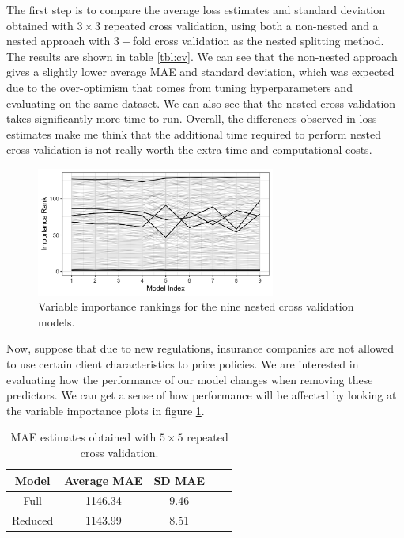 \documentclass[11pt,a4paper]{article}
\theoremstyle{plain}
\theoremstyle{definition}
\begin{document}
The first step is to compare the average loss estimates and standard deviation obtained with $3\times 3$ repeated cross validation, using both a non-nested and a nested approach with $3-$fold cross validation as the nested splitting method. The results are shown in table \ref{tbl:cv}. We can see that the non-nested approach gives a slightly lower average MAE and standard deviation, which was expected due to the over-optimism that comes from tuning hyperparameters and evaluating on the same dataset. We can also see that the nested cross validation takes significantly more time to run. Overall, the differences observed in loss estimates make me think that the additional time required to perform nested cross validation is not really worth the extra time and computational costs.

\begin{figure}[ht]
\centering
\includegraphics[width=0.7\textwidth]{importance_notitle.png}
\caption{Variable importance rankings for the nine nested cross validation models.}
\label{fig:example}
\end{figure}

Now, suppose that due to new regulations, insurance companies are not allowed to use certain client characteristics to price policies. We are interested in evaluating how the performance of our model changes when removing these predictors. We can get a sense of how performance will be affected by looking at the variable importance plots in figure \ref{fig:example}.

\begin{table}[ht]
\centering
\begin{tabular}{|c|c|c|c|c|}
\hline
Model & Average MAE & SD MAE\\
\hline
Full & 1146.34 & 9.46\\
Reduced & 1143.99 & 8.51\\
\hline
\end{tabular}
\caption{MAE estimates obtained with $5\times 5$ repeated cross validation.}
\label{tbl:diff}
\end{table}
\end{document}
